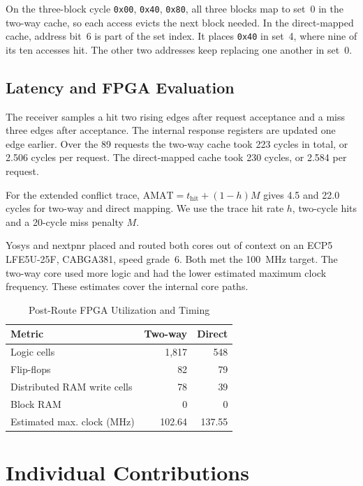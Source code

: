 \documentclass[conference]{IEEEtran}
\begin{document}
On the three-block cycle \texttt{0x00}, \texttt{0x40}, \texttt{0x80},
all three blocks map to set~0 in the two-way cache, so each access
evicts the next block needed. In the direct-mapped cache, address bit~6
is part of the set index. It places \texttt{0x40} in set~4, where nine
of its ten accesses hit. The other two addresses keep replacing one
another in set~0.

\subsection{Latency and FPGA Evaluation}

The receiver samples a hit two rising edges after request acceptance and
a miss three edges after acceptance. The internal response registers
are updated one edge earlier. Over the 89 requests the two-way cache
took 223 cycles in total, or 2.506 cycles per request. The direct-mapped
cache took 230 cycles, or 2.584 per request.

For the extended conflict trace, $\mathrm{AMAT}=t_{\mathrm{hit}}+(1-h)M$
gives 4.5 and 22.0 cycles for two-way and direct mapping. We use the
trace hit rate $h$, two-cycle hits and a 20-cycle miss penalty $M$.

Yosys and nextpnr placed and routed both cores out of context on an
ECP5 LFE5U-25F, CABGA381, speed grade~6. Both met the 100~MHz target.
The two-way core used more logic and had the lower estimated maximum
clock frequency. These estimates cover the internal core paths.

\begin{table}[ht]
\centering
\caption{Post-Route FPGA Utilization and Timing}
\label{tab:fpga}
\small
\begin{tabular}{@{}lrr@{}}
\toprule
Metric & Two-way & Direct \\
\midrule
Logic cells & 1,817 & 548 \\
Flip-flops & 82 & 79 \\
Distributed RAM write cells & 78 & 39 \\
Block RAM & 0 & 0 \\
Estimated max. clock (MHz) & 102.64 & 137.55 \\
\bottomrule
\end{tabular}
\end{table}

\section{Individual Contributions}
\end{document}
